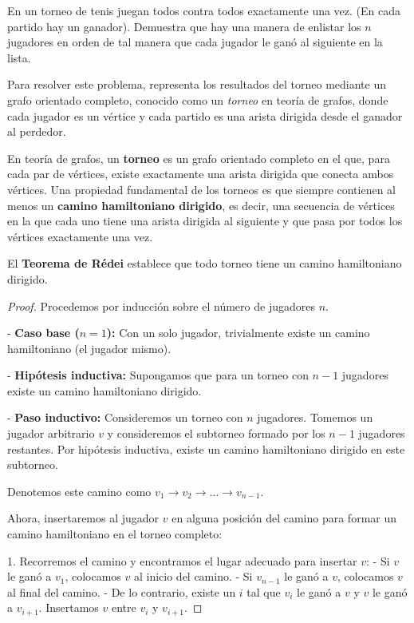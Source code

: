 \documentclass[11pt]{scrartcl}
\begin{document}
\begin{problem}
En un torneo de tenis juegan todos contra todos exactamente una vez. (En cada partido hay un ganador). Demuestra que hay una manera de enlistar los $n$ jugadores en orden de tal manera que cada jugador le ganó al siguiente en la lista.

\begin{hint}
Para resolver este problema, representa los resultados del torneo mediante un grafo orientado completo, conocido como un \textit{torneo} en teoría de grafos, donde cada jugador es un vértice y cada partido es una arista dirigida desde el ganador al perdedor.

\begin{solu}
En teoría de grafos, un \textbf{torneo} es un grafo orientado completo en el que, para cada par de vértices, existe exactamente una arista dirigida que conecta ambos vértices. Una propiedad fundamental de los torneos es que siempre contienen al menos un \textbf{camino hamiltoniano dirigido}, es decir, una secuencia de vértices en la que cada uno tiene una arista dirigida al siguiente y que pasa por todos los vértices exactamente una vez.

El \textbf{Teorema de Rédei} establece que todo torneo tiene un camino hamiltoniano dirigido.

\begin{proof}
Procedemos por inducción sobre el número de jugadores $n$.

- \textbf{Caso base ($n = 1$):} Con un solo jugador, trivialmente existe un camino hamiltoniano (el jugador mismo).

- \textbf{Hipótesis inductiva:} Supongamos que para un torneo con $n - 1$ jugadores existe un camino hamiltoniano dirigido.

- \textbf{Paso inductivo:} Consideremos un torneo con $n$ jugadores. Tomemos un jugador arbitrario $v$ y consideremos el subtorneo formado por los $n - 1$ jugadores restantes. Por hipótesis inductiva, existe un camino hamiltoniano dirigido en este subtorneo.

Denotemos este camino como $v_1 \rightarrow v_2 \rightarrow \dots \rightarrow v_{n-1}$.

Ahora, insertaremos al jugador $v$ en alguna posición del camino para formar un camino hamiltoniano en el torneo completo:

1. Recorremos el camino y encontramos el lugar adecuado para insertar $v$:
   - Si $v$ le ganó a $v_1$, colocamos $v$ al inicio del camino.
   - Si $v_{n-1}$ le ganó a $v$, colocamos $v$ al final del camino.
   - De lo contrario, existe un $i$ tal que $v_i$ le ganó a $v$ y $v$ le ganó a $v_{i+1}$. Insertamos $v$ entre $v_i$ y $v_{i+1}$.


\end{proof}
\end{solu}
\end{hint}
\end{problem}
\end{document}
